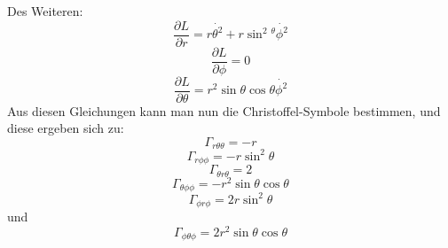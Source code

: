 \documentclass[a4paper]{article}
\begin{document}
Des Weiteren:
\begin{equation}
    \frac{\partial L}{\partial r}=r\dot{\theta^2}+r\sin^2{^\theta}\dot{\phi^2}
\end{equation}
\begin{equation}
    \frac{\partial L}{\partial\phi}=0
\end{equation}
\begin{equation}
    \frac{\partial L}{\partial\theta}=r^2\sin{\theta}\cos{\theta}\dot{\phi^2}
\end{equation}
Aus diesen Gleichungen kann man nun die Christoffel-Symbole bestimmen, und diese ergeben sich zu:
\begin{equation}
    \Gamma_{r\theta\theta}=-r
\end{equation}
\begin{equation}
    \Gamma_{r\phi\phi}=-r\sin^2{\theta}
\end{equation}
\begin{equation}
    \Gamma_{\theta r\theta}=2
\end{equation}
\begin{equation}
    \Gamma_{\theta\phi\phi}=-r^2\sin{\theta}\cos{\theta}
\end{equation}
\begin{equation}
    \Gamma_{\phi r\phi}=2r\sin^2{\theta}
\end{equation}
und
\begin{equation}
    \Gamma_{\phi\theta\phi}=2r^2\sin{\theta}\cos{\theta}
\end{equation}
\newline
\end{document}
